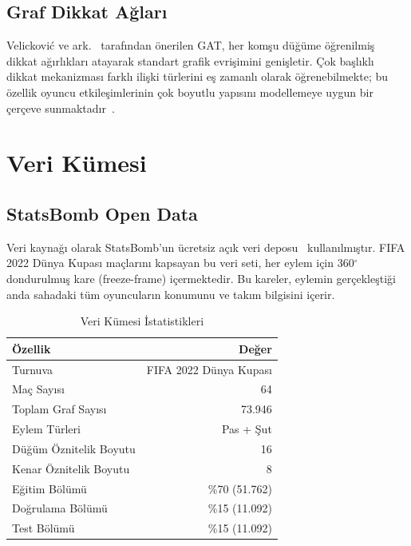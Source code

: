 \documentclass[conference]{IEEEtran}
\begin{document}
\subsection{Graf Dikkat Ağları}

Velicković ve ark.~\cite{velickovic2018gat} tarafından önerilen GAT, her komşu
düğüme öğrenilmiş dikkat ağırlıkları atayarak standart grafik evrişimini genişletir.
Çok başlıklı dikkat mekanizması farklı ilişki türlerini eş zamanlı olarak
öğrenebilmekte; bu özellik oyuncu etkileşimlerinin çok boyutlu yapısını modellemeye
uygun bir çerçeve sunmaktadır~\cite{hamilton2020graph}.

\section{Veri Kümesi}

\subsection{StatsBomb Open Data}

Veri kaynağı olarak StatsBomb'un ücretsiz açık veri deposu~\cite{statsbomb2023open}
kullanılmıştır. FIFA 2022 Dünya Kupası maçlarını kapsayan bu veri seti, her eylem için
360$^\circ$ dondurulmuş kare (freeze-frame) içermektedir. Bu kareler, eylemin
gerçekleştiği anda sahadaki tüm oyuncuların konumunu ve takım bilgisini içerir.

\begin{table}[H]
  \centering
  \caption{Veri Kümesi İstatistikleri}
  \label{tab:dataset}
  \begin{tabular}{lr}
    \toprule
    \textbf{Özellik} & \textbf{Değer} \\
    \midrule
    Turnuva & FIFA 2022 Dünya Kupası \\
    Maç Sayısı & 64 \\
    Toplam Graf Sayısı & 73.946 \\
    Eylem Türleri & Pas + Şut \\
    Düğüm Öznitelik Boyutu & 16 \\
    Kenar Öznitelik Boyutu & 8 \\
    \midrule
    Eğitim Bölümü & \%70 (51.762) \\
    Doğrulama Bölümü & \%15 (11.092) \\
    Test Bölümü & \%15 (11.092) \\
    \bottomrule
  \end{tabular}
\end{table}
\end{document}
